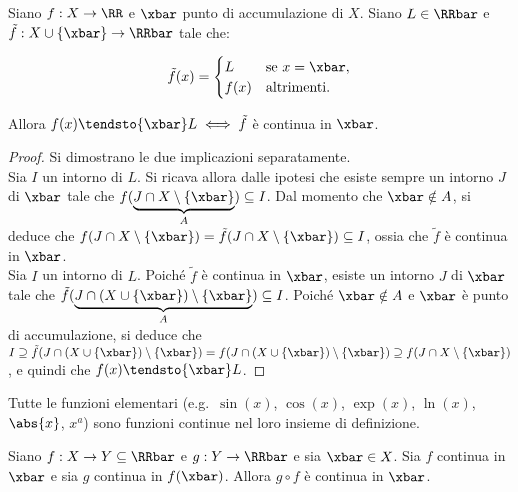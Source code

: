 \documentclass[11pt]{article}
\begin{document}
	\begin{proposition}
		Siano $f : X \to \RR$  e $\xbar$ punto di accumulazione di $X$.
		Siano $L \in \RRbar$ e $\tilde{f} : X \cup \{\xbar\} \to \RRbar$ tale
		che:
		
		\[ \tilde{f}(x) = \begin{cases}
			L & \text{se } x = \xbar, \\
			f(x) & \text{altrimenti}.
		\end{cases} \]
	
		\vskip 0.05in
	
		Allora $f(x) \tendsto{\xbar} L \iff \tilde{f}$ è continua in $\xbar$.
	\end{proposition}

	\begin{proof}
		Si dimostrano le due implicazioni separatamente. \\
		
		\rightproof Sia $I$ un intorno di $L$. Si ricava allora dalle ipotesi che esiste sempre un intorno
		$J$ di $\xbar$ tale che $f(\underbrace{J \cap X \setminus \{\xbar\}}_{A}) \subseteq I$. Dal momento che $\xbar
		\notin A$, si deduce che $f(J \cap X \setminus \{\xbar\}) = \tilde{f}(J \cap X \setminus \{\xbar\}) \subseteq I$,
		ossia che $\tilde{f}$ è continua in $\xbar$. \\
		
		\leftproof Sia $I$ un intorno di $L$. Poiché $\tilde{f}$ è continua in $\xbar$, esiste un intorno $J$ di $\xbar$
		tale che $\tilde{f}(\underbrace{J \cap (X \cup \{\xbar\}) \setminus \{\xbar\}}_{A}) \subseteq I$. Poiché $\xbar \notin A$ e $\xbar$ è punto di accumulazione, si deduce che $I \supseteq \tilde{f}(J \cap (X \cup \{\xbar\}) \setminus \{\xbar\})
		= f(J \cap (X \cup \{\xbar\}) \setminus \{\xbar\}) \supseteq f(J \cap X \setminus \{\xbar\})$, e quindi che
		$f(x) \tendsto{\xbar} L$.
	\end{proof}

	\begin{remark}
		Tutte le funzioni elementari (e.g.~$\sin(x)$, $\cos(x)$, $\exp(x)$, $\ln(x)$, $\abs{x}$, $x^a$) sono funzioni continue nel loro insieme
		di definizione.
	\end{remark}

	\begin{proposition}
		Siano $f : X \to Y \subseteq \RRbar$ e $g : Y \to \RRbar$ e sia $\xbar \in X$. Sia
		$f$ continua in $\xbar$ e sia $g$ continua in $f(\xbar)$. Allora
		$g \circ f$ è continua in $\xbar$.
	\end{proposition}
\end{document}
